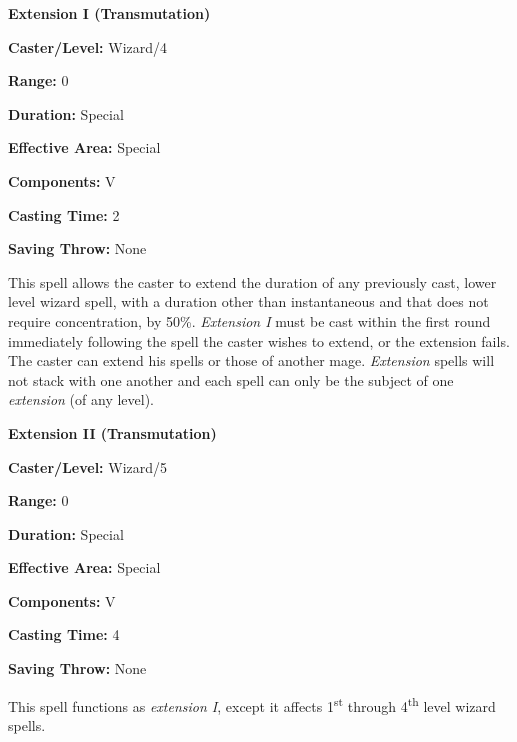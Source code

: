 \begin{multicols}{2}
\vspace{1em}

\noindent
\begin{minipage}{\columnwidth}

\noindent \textbf{Extension I (Transmutation)}

\noindent \textbf{Caster/Level:} Wizard/4

\noindent \textbf{Range:} 0

\noindent \textbf{Duration:} Special

\noindent \textbf{Effective Area:} Special 

\noindent \textbf{Components:} V

\noindent \textbf{Casting Time:} 2

\noindent \textbf{Saving Throw:} None

\end{minipage}

This spell allows the caster to extend the duration of any previously cast, lower level wizard spell, with a duration other than instantaneous and that does not require concentration, by 50\%.  \textit{Extension I} must be cast within the first round immediately following the spell the caster wishes to extend, or the extension fails.  The caster can extend his spells or those of another mage.  \textit{Extension} spells will not stack with one another and each spell can only be the subject of one \textit{extension} (of any level).  

\vspace{1em}

\noindent
\begin{minipage}{\columnwidth}

\noindent \textbf{Extension II (Transmutation)}

\noindent \textbf{Caster/Level:} Wizard/5

\noindent \textbf{Range:} 0

\noindent \textbf{Duration:} Special

\noindent \textbf{Effective Area:} Special

\noindent \textbf{Components:} V

\noindent \textbf{Casting Time:} 4

\noindent \textbf{Saving Throw:} None

\end{minipage}

This spell functions as \textit{extension I}, except it affects 1\textsuperscript{st} through 4\textsuperscript{th} level wizard spells.


\end{multicols}
